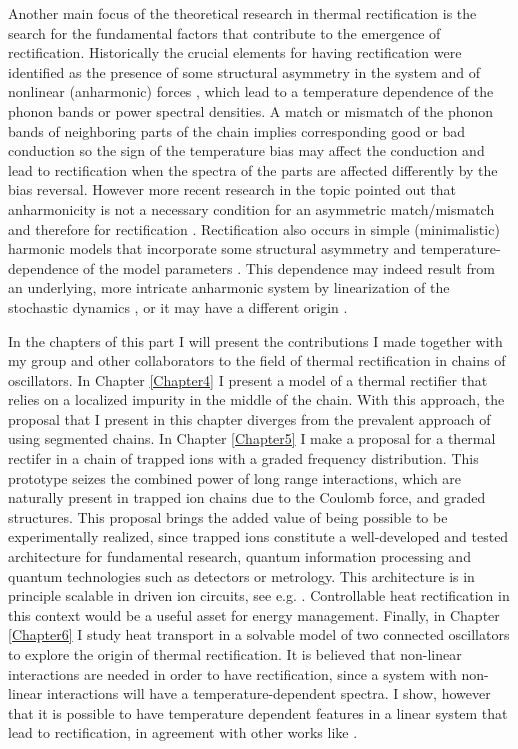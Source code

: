 Another main focus of the theoretical research in thermal rectification is the search for the fundamental factors that contribute to the emergence of rectification. Historically the crucial elements for having rectification were identified as the presence of some structural asymmetry in the system and of nonlinear (anharmonic) forces \cite{Zeng2008,Katz2016,Li2008,Hu2006,Benenti2016,Li2012,Segal2005,Segal2005b}, which lead to a temperature dependence of the phonon bands or power spectral densities. A match or mismatch of the phonon bands of neighboring parts of the chain implies corresponding good or bad conduction so the
sign of the temperature bias may affect the conduction and lead to rectification when the spectra of the parts are affected differently by the bias reversal. However more recent research in the topic pointed out  that anharmonicity is not a necessary condition for an asymmetric match/mismatch and therefore for rectification \cite{Pereira2017}. Rectification also occurs in simple (minimalistic) harmonic models that incorporate some structural asymmetry and temperature-dependence of the model parameters \cite{Pereira2017}. This dependence may indeed result from an underlying, more intricate  anharmonic system by linearization of the stochastic dynamics \cite{Pereira2017,Pereira2019}, or it may have a different origin \cite{Simon2019}.

In the chapters of this part I will present the contributions I made together with my group and other collaborators to the field of thermal rectification in chains of oscillators. In Chapter \ref{Chapter4} I present a model of a thermal rectifier that relies on a localized impurity in the middle of the chain. With this approach, the proposal that I present in this chapter diverges from the prevalent approach of using segmented chains. In Chapter \ref{Chapter5} I make a proposal for a thermal rectifer in a chain of trapped ions with a graded frequency distribution. This prototype seizes the combined power of long range interactions, which are naturally present in trapped ion chains due to the Coulomb force, and graded structures. This proposal brings the added value of being possible to be experimentally realized, since trapped ions constitute a well-developed and tested  architecture for fundamental research, quantum information processing and quantum technologies such as detectors or metrology. This architecture is  in principle scalable in driven ion circuits, see e.g. \cite{Bruzewicz2019}. Controllable heat rectification in this context
would be a useful asset for energy management. Finally, in Chapter \ref{Chapter6} I study heat transport in a solvable model of two connected oscillators to explore the origin of thermal rectification. It is believed that non-linear interactions are needed in order to have rectification, since a system with non-linear interactions will have a temperature-dependent spectra. I show, however that it is possible to have temperature dependent features in a linear system that lead to rectification, in agreement with other works like \cite{Pereira2017}.
